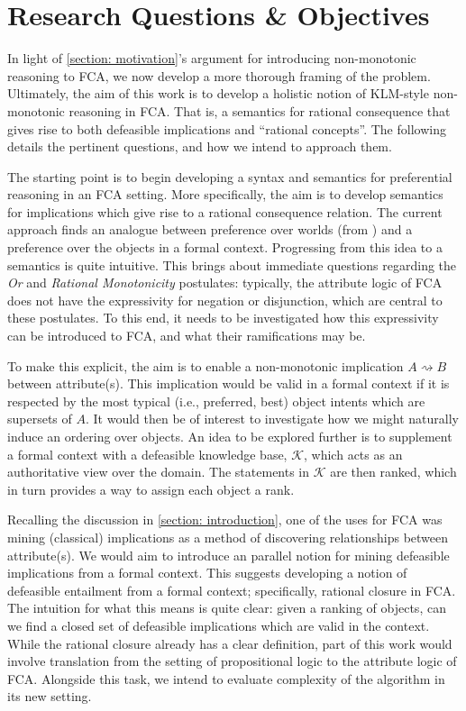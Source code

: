 \section{Research Questions \& Objectives}
\label{section: research objectives}

In light of \cref{section: motivation}'s argument for introducing non-monotonic reasoning to FCA, we now develop a more thorough framing of the problem. Ultimately, the aim of this work is to develop a holistic notion of KLM-style non-monotonic reasoning in FCA. That is, a semantics for rational consequence that gives rise to both defeasible implications and ``rational concepts''. The following details the pertinent questions, and how we intend to approach them.

The starting point is to begin developing a syntax and semantics for preferential reasoning in an FCA setting. More specifically, the aim is to develop semantics for implications which give rise to a rational consequence relation. The current approach finds an analogue between preference over worlds (from \cite{shoham1987reasoning,kraus1990nonmonotonic}) and a preference over the objects in a formal context. Progressing from this idea to a semantics is quite intuitive. This brings about immediate questions regarding the \textit{Or} and \textit{Rational Monotonicity} postulates: typically, the attribute logic of FCA does not have the expressivity for negation or disjunction, which are central to these postulates. To this end, it needs to be investigated how this expressivity can be introduced to FCA, and what their ramifications may be.

To make this explicit, the aim is to enable a non-monotonic implication $A \rightsquigarrow B$ between attribute(s). This implication would be valid in a formal context if it is respected by the most typical (i.e., preferred, best) object intents which are supersets of $A$. It would then be of interest to investigate how we might naturally induce an ordering over objects. An idea to be explored further is to supplement a formal context with a defeasible knowledge base, $\mathcal{K}$, which acts as an authoritative view over the domain. The statements in $\mathcal{K}$ are then ranked, which in turn provides a way to assign each object a rank.

Recalling the discussion in \cref{section: introduction}, one of the uses for FCA was mining (classical) implications as a method of discovering relationships between attribute(s). We would aim to introduce an parallel notion for mining defeasible implications from a formal context. This suggests developing a notion of defeasible entailment from a formal context; specifically, rational closure in FCA. The intuition for what this means is quite clear: given a ranking of objects, can we find a closed set of defeasible implications which are valid in the context. While the rational closure already has a clear definition, part of this work would involve translation from the setting of propositional logic to the attribute logic of FCA. Alongside this task, we intend to evaluate complexity of the algorithm in its new setting.

